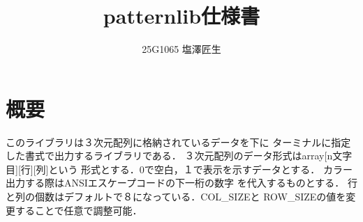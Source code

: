 \documentclass[uplatex]{jsarticle}
\begin{document}
\title{patternlib仕様書}
\author{25G1065 塩澤匠生}

\maketitle


\section{概要}
このライブラリは３次元配列に格納されているデータを下に
ターミナルに指定した書式で出力するライブラリである．
３次元配列のデータ形式はarray[n文字目][行][列]という
形式とする．0で空白，１で表示を示すデータとする．
カラー出力する際はANSIエスケープコードの下一桁の数字
を代入するものとする．
行と列の個数はデフォルトで８になっている．COL_SIZEと
ROW_SIZEの値を変更することで任意で調整可能．
\end{document}
